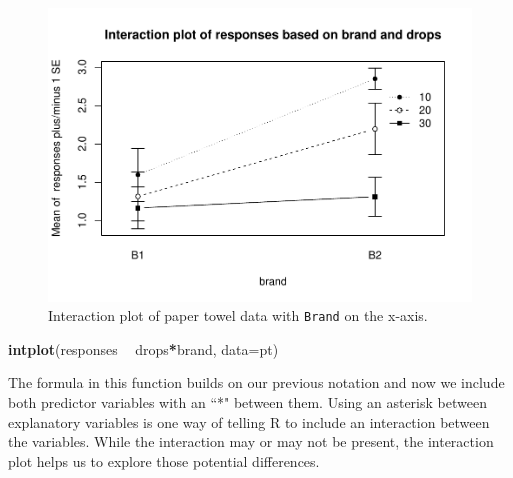 \documentclass[]{book}
\newenvironment{Shaded}{\begin{snugshade}}{\end{snugshade}}
\newcommand{\KeywordTok}[1]{\textcolor[rgb]{0.13,0.29,0.53}{\textbf{#1}}}
\newcommand{\DataTypeTok}[1]{\textcolor[rgb]{0.13,0.29,0.53}{#1}}
\newcommand{\StringTok}[1]{\textcolor[rgb]{0.31,0.60,0.02}{#1}}
\newcommand{\OperatorTok}[1]{\textcolor[rgb]{0.81,0.36,0.00}{\textbf{#1}}}
\newcommand{\NormalTok}[1]{#1}
\theoremstyle{definition}
\theoremstyle{definition}
\theoremstyle{remark}
\begin{document}
\begin{figure}
\centering
\includegraphics{04-twoWayAnova_files/figure-latex/Figure4-3-1.pdf}
\caption{\label{fig:Figure4-3}Interaction plot of paper towel data with \texttt{Brand} on
the x-axis.}
\end{figure}

\begin{Shaded}
\begin{Highlighting}[]
\KeywordTok{intplot}\NormalTok{(responses }\OperatorTok{~}\StringTok{ }\NormalTok{drops}\OperatorTok{*}\NormalTok{brand, }\DataTypeTok{data=}\NormalTok{pt)}
\end{Highlighting}
\end{Shaded}

The formula in this function builds on our previous notation and now we
include both predictor variables with an ``*" between them. Using an
asterisk between explanatory variables is one way of telling R to
include an interaction between the variables. While the interaction may
or may not be present, the interaction plot helps us to explore those
potential differences.
\end{document}
